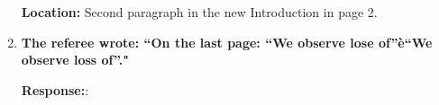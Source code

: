 \documentclass[12pt]{article}
\begin{document}
\begin{enumerate}
\noindent
{\bf Location:} Second paragraph in the new Introduction in page 2.

\item {\bf The referee wrote: ``On the last page: “We observe lose of”è“We observe loss of”."}

\noindent
{\bf Response:}: \end{enumerate}
\end{document}
